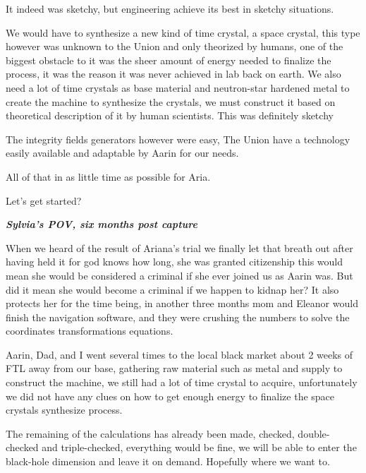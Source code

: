 \documentclass[colorlinks,12pt,a4paper]{book}
\begin{document}
 It indeed was sketchy, but engineering achieve its best in sketchy situations. \par
 \bigskip
 We would have to synthesize a new kind of time crystal, a space crystal, this type however was unknown to the 
 Union and only theorized by humans, one of the biggest obstacle to it was the sheer amount of energy needed to finalize 
 the process, it was the reason it was never achieved in lab back on earth. We also need a lot of time crystals as base
  material and neutron-star hardened metal to create the machine to synthesize the crystals, we must construct it based 
  on theoretical description of it by human scientists. This was definitely sketchy\par
  \bigskip
 
 The integrity fields generators however were easy, The Union have a technology easily available and adaptable by Aarin 
 for our needs.\par
 \bigskip
 All of that in as little time as possible for Aria.\par
 \bigskip
 Let's get started?\par
 \bigskip
 
 \textit{\textbf{Sylvia's POV, six months post capture}}\par
 \bigskip
 
 When we heard of the result of Ariana's trial we finally let that breath out after having held it for god knows how long, 
 she was granted citizenship this would mean she would be considered a criminal if she ever joined us as Aarin was. But 
 did it mean she would become a criminal if we happen to kidnap her? It also protects her for the time being, in another 
 three months mom and Eleanor would finish the navigation software, and they were crushing the numbers to solve the 
 coordinates transformations equations.\par
 \bigskip
 
 Aarin, Dad, and I went several times to the local black market about 2 weeks of FTL away from our base, gathering raw 
 material such as metal and supply to construct the machine, we still had a lot of time crystal to acquire, unfortunately we did 
 not have any clues on how to get enough energy to finalize the space crystals synthesize process.\par
 \bigskip
 
 The remaining of the calculations has already been made, checked, double-checked and triple-checked, everything would 
 be fine, we will be able to enter the black-hole dimension and leave it on demand. Hopefully where we want to.\par
 \bigskip
 
\end{document}
